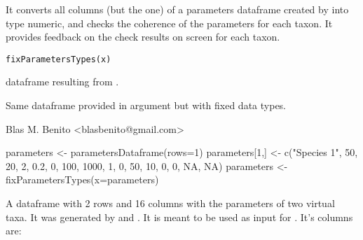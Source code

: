 \documentclass[letterpaper]{book}
\begin{document}
%
\begin{Description}\relax
It converts all columns (but the  one) of a parameters dataframe created by  into type numeric, and checks the coherence of the parameters for each taxon. It provides feedback on the check results on screen for each taxon.
\end{Description}
%
\begin{Usage}
\begin{verbatim}
fixParametersTypes(x)
\end{verbatim}
\end{Usage}
%
\begin{Arguments}
\begin{ldescription}
\item[\code{x}] dataframe resulting from .
\end{ldescription}
\end{Arguments}
%
\begin{Value}
Same dataframe provided in argument  but with fixed data types.
\end{Value}
%
\begin{Author}\relax
Blas M. Benito  <blasbenito@gmail.com>
\end{Author}
%
\begin{SeeAlso}\relax
{}
\end{SeeAlso}
%
\begin{Examples}
\begin{ExampleCode}

parameters <- parametersDataframe(rows=1)
parameters[1,] <- c("Species 1", 50, 20, 2, 0.2, 0, 100, 1000, 1, 0, 50, 10, 0, 0, NA, NA)
parameters <- fixParametersTypes(x=parameters)

\end{ExampleCode}
\end{Examples}
%
\begin{Description}\relax
A dataframe with 2 rows and 16 columns with the parameters of two virtual taxa. It was generated by  and . It is meant to be used as input for . It's columns are:
\end{Description}
\end{document}
